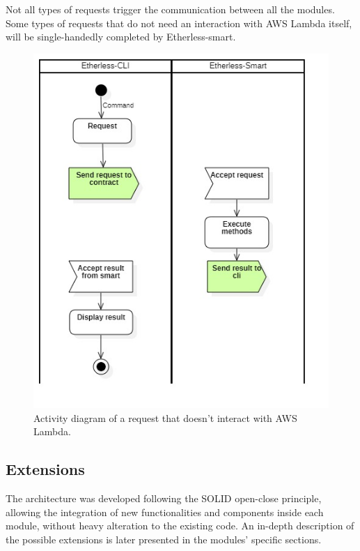 	Not all types of requests trigger the communication between all the modules. Some types of requests that do not need an interaction with AWS Lambda itself, will be single-handedly completed by Etherless-smart.
	\begin{figure} [h!]
		\centering
		\includegraphics[width=0.8\linewidth]{diagrammi/generali/activity_diag_pattern1}
		\caption{Activity diagram of a request that doesn't interact with AWS Lambda.}
	\end{figure}
	\pagebreak
	\subsection{Extensions} %
	The architecture was developed following the SOLID open-close principle, allowing the integration of new functionalities and components inside each module, without heavy alteration to the existing code. An in-depth description of the possible extensions is later presented in the modules' specific sections.
